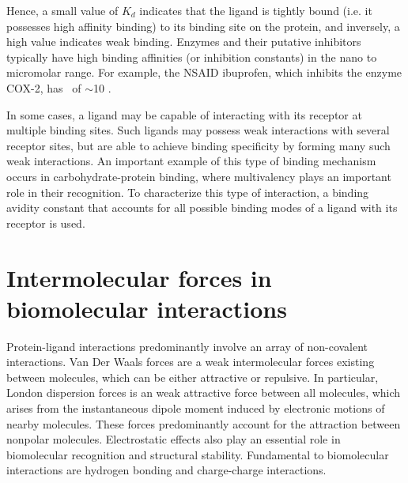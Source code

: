 Hence, a small value of $K_{d}$ indicates that the ligand is tightly bound (i.e. it possesses high affinity binding) to its binding site on the protein, and inversely, a high value indicates weak binding. Enzymes and their putative inhibitors typically have high binding affinities (or inhibition constants) in the nano to micromolar range. For example, the NSAID ibuprofen, which inhibits the enzyme COX-2, has \KD\ of $\sim$10 \micromolar.\cite{Cryer:1998ti} 

In some cases, a ligand may be capable of interacting with its receptor at multiple binding sites. Such ligands may possess weak interactions with several receptor sites, but are able to achieve binding specificity by forming many such weak interactions. An important example of this type of binding mechanism occurs in carbohydrate-protein binding, where multivalency plays an important role in their recognition. To characterize this type of interaction, a binding avidity constant that accounts for all possible binding modes of a ligand with its receptor is used.\cite{Krishnamurthy:2006vi}

\section{Intermolecular forces in biomolecular interactions}



Protein-ligand interactions predominantly involve an array of non-covalent interactions.  Van Der Waals forces are a weak intermolecular forces existing between molecules, which can be either attractive or repulsive. In particular, London dispersion forces is an weak attractive force between all molecules, which arises from the instantaneous dipole moment induced by electronic motions of nearby molecules. These forces predominantly account for the attraction between nonpolar molecules.  Electrostatic effects also play an essential role in biomolecular recognition and structural stability. Fundamental to biomolecular interactions are hydrogen bonding and charge-charge interactions.\cite{Nakamura:1996vm}


